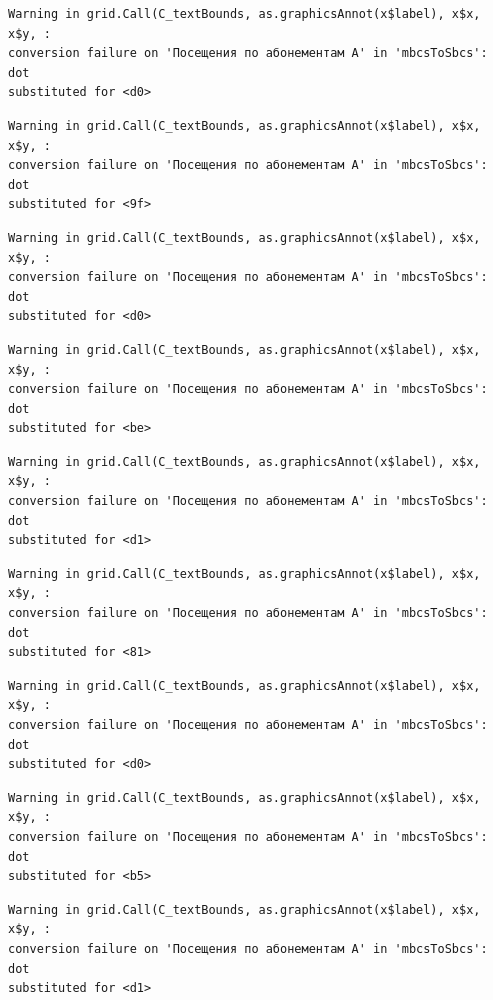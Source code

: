 \documentclass[
  letterpaper,
  DIV=11,
  numbers=noendperiod]{scrartcl}
\begin{document}
\begin{verbatim}
Warning in grid.Call(C_textBounds, as.graphicsAnnot(x$label), x$x, x$y, :
conversion failure on 'Посещения по абонементам А' in 'mbcsToSbcs': dot
substituted for <d0>
\end{verbatim}

\begin{verbatim}
Warning in grid.Call(C_textBounds, as.graphicsAnnot(x$label), x$x, x$y, :
conversion failure on 'Посещения по абонементам А' in 'mbcsToSbcs': dot
substituted for <9f>
\end{verbatim}

\begin{verbatim}
Warning in grid.Call(C_textBounds, as.graphicsAnnot(x$label), x$x, x$y, :
conversion failure on 'Посещения по абонементам А' in 'mbcsToSbcs': dot
substituted for <d0>
\end{verbatim}

\begin{verbatim}
Warning in grid.Call(C_textBounds, as.graphicsAnnot(x$label), x$x, x$y, :
conversion failure on 'Посещения по абонементам А' in 'mbcsToSbcs': dot
substituted for <be>
\end{verbatim}

\begin{verbatim}
Warning in grid.Call(C_textBounds, as.graphicsAnnot(x$label), x$x, x$y, :
conversion failure on 'Посещения по абонементам А' in 'mbcsToSbcs': dot
substituted for <d1>
\end{verbatim}

\begin{verbatim}
Warning in grid.Call(C_textBounds, as.graphicsAnnot(x$label), x$x, x$y, :
conversion failure on 'Посещения по абонементам А' in 'mbcsToSbcs': dot
substituted for <81>
\end{verbatim}

\begin{verbatim}
Warning in grid.Call(C_textBounds, as.graphicsAnnot(x$label), x$x, x$y, :
conversion failure on 'Посещения по абонементам А' in 'mbcsToSbcs': dot
substituted for <d0>
\end{verbatim}

\begin{verbatim}
Warning in grid.Call(C_textBounds, as.graphicsAnnot(x$label), x$x, x$y, :
conversion failure on 'Посещения по абонементам А' in 'mbcsToSbcs': dot
substituted for <b5>
\end{verbatim}

\begin{verbatim}
Warning in grid.Call(C_textBounds, as.graphicsAnnot(x$label), x$x, x$y, :
conversion failure on 'Посещения по абонементам А' in 'mbcsToSbcs': dot
substituted for <d1>
\end{verbatim}
\end{document}

